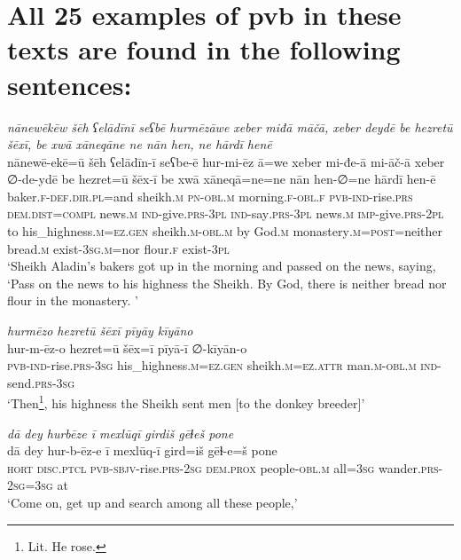 \chapter{All 25 examples of pvb in these texts are found in the following sentences:}

\ea \label{HB.2}
\textit{nānewēkēw šēh ʕelādīnī seʕbē hurmēzāwe xeber miđā māčā, xeber deydē be hezretū šēxī, be xwā xāneqāne ne nān hen, ne hārdī henē} \\ 
\gll nānewē-ekē=ū šēh ʕelādīn-ī seʕbe-ē hur-mi-ēz ā=we xeber mi-đe-ā mi-āč-ā xeber ∅-de-ydē be hezret=ū šēx-ī be xwā xāneqā=ne=ne nān hen-∅=ne hārdī hen-ē \\ 
 baker\textsc{\textsc{.f}}\textsc{-def}\textsc{.dir}\textsc{.pl}=and sheikh\textsc{.m} \textsc{pn}\textsc{-obl}\textsc{.m} morning\textsc{\textsc{.f}}\textsc{-obl}\textsc{\textsc{.f}} \textsc{pvb-}\textsc{ind-}rise\textsc{.prs} \textsc{dem.dist}\textsc{=compl} news\textsc{.m} \textsc{ind-}give\textsc{.prs}\textsc{-3pl} \textsc{ind-}say\textsc{.prs}\textsc{-3pl} news\textsc{.m} \textsc{imp-}give\textsc{.prs}\textsc{-2pl} to his\_highness\textsc{.m}\textsc{=ez}\textsc{.gen} sheikh\textsc{.m}\textsc{-obl}\textsc{.m} by God\textsc{.m} monastery\textsc{.m}\textsc{=\textsc{post}}=neither bread\textsc{.m} exist\textsc{-3sg}\textsc{.m}=nor flour\textsc{\textsc{.f}} exist\textsc{-3pl} \\ 
\glt `Sheikh Aladin’s bakers got up in the morning and passed on the news, saying, ‘Pass on the news to his highness the Sheikh. By God, there is neither bread nor flour in the monastery. '
\z 
 
\ea \label{HB.78}
\textit{hurmēzo hezretū šēxī pīyāy kīyāno} \\ 
\gll hur-m-ēz-o hezret=ū šēx=ī pīyā-ī ∅-kīyān-o \\ 
 \textsc{pvb-}\textsc{ind-}rise\textsc{.prs}\textsc{-3sg} his\_highness\textsc{.m}\textsc{=ez}\textsc{.gen} sheikh\textsc{.m}\textsc{=ez}.\textsc{attr} man\textsc{.m}\textsc{-obl}\textsc{.m} \textsc{ind-}send\textsc{.prs}\textsc{-3sg} \\ 
\glt `Then\footnote{Lit. He rose.}, his highness the Sheikh sent men [to the donkey breeder]'
\z 
 
\ea \label{HB.90}
\textit{dā dey hurbēze ī mexlūqī girdiš gēɫeš pone} \\ 
\gll dā dey hur-b-ēz-e ī mexlūq-ī gird=iš gēɫ-e=š pone \\ 
 \textsc{hort} \textsc{disc.ptcl} \textsc{pvb-}\textsc{sbjv-}rise\textsc{.prs}-\textsc{2sg} \textsc{dem.prox} people\textsc{-obl}\textsc{.m} all\textsc{=3sg} wander\textsc{.prs}-\textsc{2sg}\textsc{=3sg} at \\ 
\glt `Come on, get up and search among all these people,'
\z 
 
